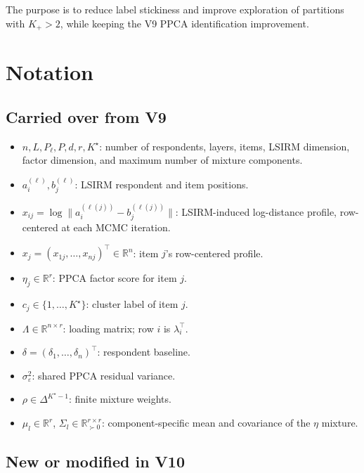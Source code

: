 \documentclass[11pt]{article}
\begin{document}
The purpose is to reduce label stickiness and improve exploration of
partitions with $K_+>2$, while keeping the V9 PPCA identification
improvement.

\section{Notation}

\subsection*{Carried over from V9}

\begin{itemize}[leftmargin=1.5em]
    \item $n,L,P_\ell,P,d,r,K^\star$: number of respondents, layers, items,
    LSIRM dimension, factor dimension, and maximum number of mixture
    components.
    \item $a_i^{(\ell)},b_j^{(\ell)}$: LSIRM respondent and item positions.
    \item $x_{ij}=\log\|a_i^{(\ell(j))}-b_j^{(\ell(j))}\|$: LSIRM-induced
    log-distance profile, row-centered at each MCMC iteration.
    \item $x_j=(x_{1j},\dots,x_{nj})^\top\in\mathbb R^n$: item $j$'s
    row-centered profile.
    \item $\eta_j\in\mathbb R^r$: PPCA factor score for item $j$.
    \item $c_j\in\{1,\dots,K^\star\}$: cluster label of item $j$.
    \item $\Lambda\in\mathbb R^{n\times r}$: loading matrix; row $i$ is
    $\lambda_i^\top$.
    \item $\delta=(\delta_1,\dots,\delta_n)^\top$: respondent baseline.
    \item $\sigma_\varepsilon^2$: shared PPCA residual variance.
    \item $\rho\in\Delta^{K^\star-1}$: finite mixture weights.
    \item $\mu_l\in\mathbb R^r$, $\Sigma_l\in\mathbb R^{r\times r}_{\succ0}$:
    component-specific mean and covariance of the $\eta$ mixture.
\end{itemize}

\subsection*{New or modified in V10}
\end{document}
